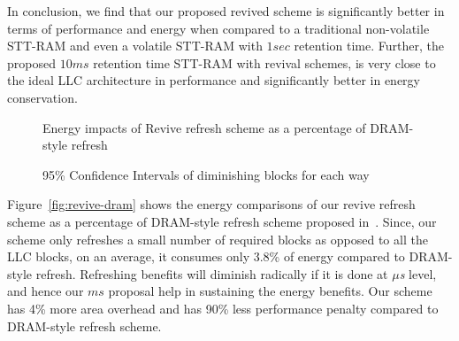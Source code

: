 In conclusion, we find that our proposed revived scheme is significantly better in terms of performance and energy
when compared to a traditional non-volatile STT-RAM and even a volatile STT-RAM with $1sec$ retention time.
Further, the proposed $10ms$ retention time STT-RAM with revival schemes, is very close to the ideal LLC architecture in performance and significantly better in energy conservation.



\begin{figure*} %
\begin{minipage}{0.580\textwidth}
\centering
 \caption{\label{fig:revive-dram} Energy impacts of Revive refresh scheme \newline as a percentage of DRAM-style refresh}
\end{minipage}
\hfill %
\begin{minipage}{0.38\textwidth}
 \centering
 \caption{\label{fig:confi} 95\% Confidence Intervals of diminishing blocks for each way}
\end{minipage}
\end{figure*}



Figure~\ref{fig:revive-dram} shows the energy comparisons of our revive refresh scheme as a percentage of
DRAM-style refresh scheme proposed in~\cite{STTRAM:HPCA11}. Since, our scheme only refreshes a small
number of required blocks as opposed to all the LLC blocks, on an average, it consumes only 3.8\% of energy compared
to DRAM-style refresh. Refreshing benefits will diminish radically if it is done at {\it $\mu$s} level, and hence our $ms$ proposal help in sustaining the energy benefits. Our scheme has 4\% more area overhead and 
has 90\% less performance penalty compared to DRAM-style refresh scheme.


